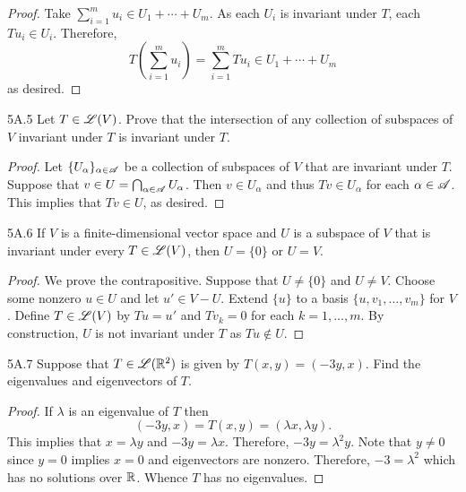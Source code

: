 \documentclass[../../AlgebraQualSolutions.tex]{subfiles}
\begin{document}
\begin{proof}
Take $\sum_{i=1}^m u_i \in U_1 + \cdots + U_m$. As each $U_i$ is invariant under $T$, each $Tu_i \in U_i$. Therefore,
	\[T\left(\sum_{i=1}^m u_i\right) = \sum_{i=1}^m Tu_i \in U_1 + \cdots + U_m \]
as desired.
\end{proof}

\begin{LA}{5A.5}{}
Let $T \in \mathscr{L}(V)$. Prove that the intersection of any collection of subspaces of $V$ invariant under $T$ is invariant under $T$.
\end{LA}

\begin{proof}
Let $\{U_\alpha\}_{\alpha \in \mathscr{A}}$ be a collection of subspaces of $V$ that are invariant under $T$. Suppose that $v \in U = \bigcap_{\alpha \in \mathscr{A}} U_\alpha$. Then $v \in U_\alpha$ and thus $Tv \in U_\alpha$ for each $\alpha \in \mathscr{A}$. This implies that $Tv \in U$, as desired.
\end{proof}

\begin{LA}{5A.6}{}
If $V$ is a finite-dimensional vector space and $U$ is a subspace of $V$ that is invariant under every $T \in \mathscr{L}(V)$, then $U = \{0\}$ or $U = V$.
\end{LA}

\begin{proof}
We prove the contrapositive. Suppose that $U \neq \{0\}$ and $U \neq V$. Choose some nonzero $u \in U$ and let $u' \in V - U$. Extend $\{u\}$ to a basis $\{u, v_1, \ldots, v_m \}$ for $V$. Define $T \in \mathscr{L}(V)$ by $Tu = u'$ and $Tv_k = 0$ for each $k = 1, \ldots, m$. By construction, $U$ is not invariant under $T$ as $Tu \not\in U$.
\end{proof}

\begin{LA}{5A.7}{}
Suppose that $T \in \mathscr{L}(\mathbb{R}^2)$ is given by $T(x,y) = (-3y, x)$. Find the eigenvalues  and eigenvectors of $T$.
\end{LA}

\begin{proof}
If $\lambda$ is an eigenvalue of $T$ then
	\[(-3y, x) = T(x,y) = (\lambda x, \lambda y). \]
This implies that $x = \lambda y$ and $-3y = \lambda x$. Therefore, $-3y = \lambda^2 y$. Note that $y\neq 0$ since $y = 0$ implies $x = 0$ and eigenvectors are nonzero. Therefore, $-3 = \lambda^2$ which has no solutions over $\mathbb{R}$. Whence $T$ has no eigenvalues.
\end{proof}
\end{document}
